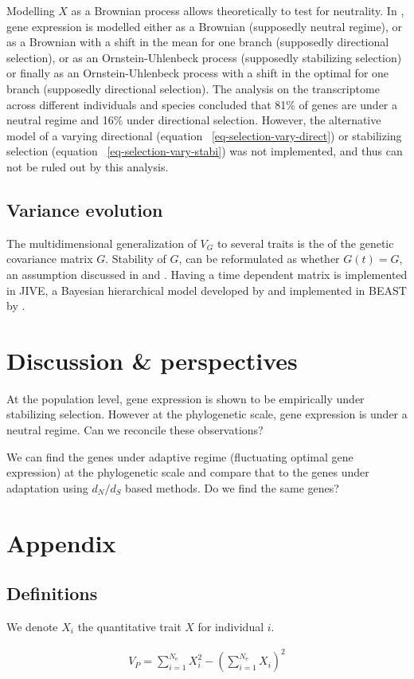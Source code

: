 \documentclass{article}
\renewcommand*{\bm}[1]{#1}%
\newcommand{\BiDimArray}[1]{\bm{#1}}
\newcommand{\Ne}{N_{\text{e}}}
\newcommand{\dn}{d_N}
\newcommand{\ds}{d_S}
\newcommand{\dnds}{\dn / \ds}
\newcommand{\VarPhenotype}{V_{P}}
\newcommand{\VarGenetic}{V_{G}}
\newcommand{\MatrixGenetic}{\BiDimArray{G}}
\newcommand{\Trait}{X}
\begin{document}
Modelling $\Trait$ as a Brownian process allows theoretically to test for neutrality.
In \citet{catalan_drift_2019}, gene expression is modelled either as a Brownian (supposedly neutral regime), or as a Brownian with a shift in the mean for one branch (supposedly directional selection), or as an Ornstein-Uhlenbeck process (supposedly stabilizing selection) or finally as an Ornstein-Uhlenbeck process with a shift in the optimal for one branch (supposedly directional selection). 
The analysis on the transcriptome across different individuals and species concluded that 81\% of genes are under a neutral regime and 16\% under directional selection. 
However, the alternative model of a varying directional (equation~ \ref{eq-selection-vary-direct}) or stabilizing selection (equation~ \ref{eq-selection-vary-stabi}) was not implemented, and thus can not be ruled out by this analysis.  

\subsection{Variance evolution}

The multidimensional generalization of $\VarGenetic$ to several traits is the of the genetic covariance matrix $\MatrixGenetic$.
Stability of $\MatrixGenetic$, can be reformulated as whether $\MatrixGenetic (t) = \MatrixGenetic$, an assumption discussed in \citet{arnold_understanding_2008} and \citet{hohenlohe_mipod_2008}. Having a time dependent matrix is implemented in JIVE, a Bayesian hierarchical model developed by \citet{kostikova_bridging_2016} and implemented in BEAST by \citet{gaboriau_multi-platform_2020}.

\section{Discussion \& perspectives}
At the population level, gene expression is shown to be empirically under stabilizing selection. However at the phylogenetic scale, gene expression is under a neutral regime. Can we reconcile these observations?

We can find the genes under adaptive regime (fluctuating optimal gene expression) at the phylogenetic scale and compare that to the genes under adaptation using $\dnds$ based methods. Do we find the same genes?
\section{Appendix}

\subsection{Definitions}

We denote $\Trait_{i}$ the quantitative trait $\Trait$ for individual $i$.

\begin{align}
    \VarPhenotype = \sum_{i=1}^{\Ne} \Trait_{i}^2 - \left( \sum_{i=1}^{\Ne} \Trait_{i} \right)^2
\end{align}


\end{document}
